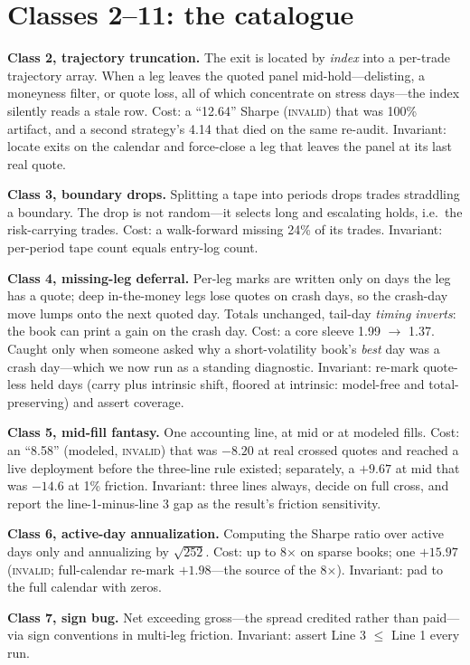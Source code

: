 \documentclass[11pt]{article}
\begin{document}
\section{Classes 2--11: the catalogue}\label{sec:short}
\textbf{Class 2, trajectory truncation.} The exit is located by \emph{index} into a per-trade
trajectory array. When a leg leaves the quoted panel mid-hold---delisting, a moneyness filter,
or quote loss, all of which concentrate on stress days---the index silently reads a stale row.
Cost: a ``12.64'' Sharpe (\textsc{invalid}) that was 100\% artifact, and a second strategy's
4.14 that died on the same re-audit. Invariant: locate exits on the calendar and force-close a
leg that leaves the panel at its last real quote.

\textbf{Class 3, boundary drops.} Splitting a tape into periods drops trades straddling a
boundary. The drop is not random---it selects long and escalating holds, i.e.\ the
risk-carrying trades. Cost: a walk-forward missing 24\% of its trades. Invariant: per-period
tape count equals entry-log count.

\textbf{Class 4, missing-leg deferral.} Per-leg marks are written only on days the leg has a
quote; deep in-the-money legs lose quotes on crash days, so the crash-day move lumps onto the
next quoted day. Totals unchanged, tail-day \emph{timing inverts}: the book can print a gain on
the crash day. Cost: a core sleeve 1.99 $\to$ 1.37. Caught only when someone asked why a
short-volatility book's \emph{best} day was a crash day---which we now run as a standing
diagnostic. Invariant: re-mark quote-less held days (carry plus intrinsic shift, floored at
intrinsic: model-free and total-preserving) and assert coverage.

\textbf{Class 5, mid-fill fantasy.} One accounting line, at mid or at modeled fills. Cost: an
``8.58'' (modeled, \textsc{invalid}) that was $-8.20$ at real crossed quotes and reached a live
deployment before the three-line rule existed; separately, a $+9.67$ at mid that was $-14.6$ at
1\% friction. Invariant: three lines always, decide on full cross, and report the
line-1-minus-line 3 gap as the result's friction sensitivity.

\textbf{Class 6, active-day annualization.} Computing the Sharpe ratio over active days only
and annualizing by $\sqrt{252}$. Cost: up to 8$\times$ on sparse books; one $+15.97$
(\textsc{invalid}; full-calendar re-mark $+1.98$---the source of the 8$\times$). Invariant: pad
to the full calendar with zeros.

\textbf{Class 7, sign bug.} Net exceeding gross---the spread credited rather than paid---via
sign conventions in multi-leg friction. Invariant: assert Line 3 $\le$ Line 1 every run.
\end{document}
